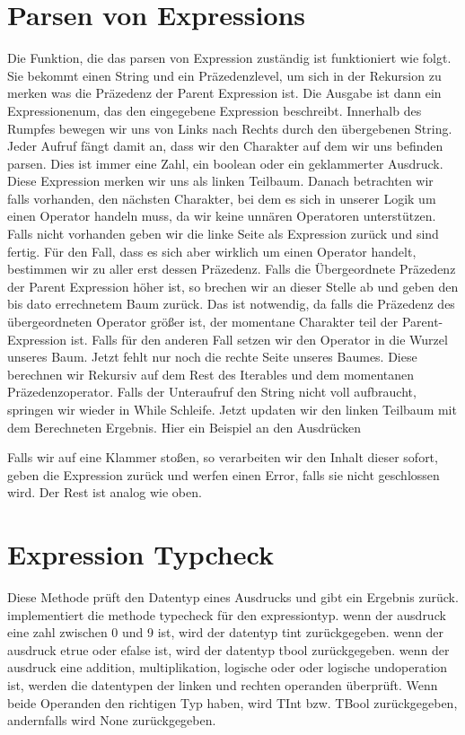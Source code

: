 \documentclass[a4paper, 1ppt]{article}
\begin{document}
\section{Parsen von Expressions}
Die Funktion, die das parsen von Expression zuständig ist funktioniert wie folgt.
Sie bekommt einen String und ein Präzedenzlevel, um sich in der Rekursion zu merken
was die Präzedenz der Parent Expression ist. Die Ausgabe ist dann ein Expressionenum, das den eingegebene Expression beschreibt.
Innerhalb des Rumpfes bewegen wir uns von Links nach Rechts durch den übergebenen String.
Jeder Aufruf fängt damit an, dass wir den Charakter auf dem wir uns befinden parsen.
Dies ist immer eine Zahl, ein boolean oder ein geklammerter Ausdruck. 
Diese Expression merken wir uns als linken Teilbaum.
Danach betrachten wir falls vorhanden, den nächsten Charakter, bei dem es sich in unserer Logik um einen Operator handeln muss, 
da wir keine unnären Operatoren unterstützen. Falls nicht vorhanden geben wir die linke Seite als Expression zurück und sind fertig.
Für den Fall, dass es sich aber wirklich um einen Operator handelt, bestimmen wir zu aller erst dessen Präzedenz.
Falls die Übergeordnete Präzedenz der Parent Expression höher ist, so brechen wir an dieser Stelle ab und geben den bis dato errechnetem Baum zurück.
Das ist notwendig, da falls die Präzedenz des übergeordneten Operator größer ist, der momentane Charakter teil der Parent-Expression ist.
Falls für den anderen Fall setzen wir den Operator in die Wurzel unseres Baum. 
Jetzt fehlt nur noch die rechte Seite unseres Baumes.
Diese berechnen wir Rekursiv auf dem Rest des Iterables und dem momentanen Präzedenzoperator.
Falls der Unteraufruf den String nicht voll aufbraucht, springen wir wieder in While Schleife.
Jetzt updaten wir den linken Teilbaum mit dem Berechneten Ergebnis.
Hier ein Beispiel an den Ausdrücken 

Falls wir auf eine Klammer stoßen, so verarbeiten wir den Inhalt dieser sofort, geben die Expression zurück und werfen einen Error, falls sie nicht geschlossen wird. Der Rest ist analog wie oben.
\section{Expression Typcheck}
Diese Methode prüft den Datentyp eines Ausdrucks und gibt ein Ergebnis zurück.
implementiert die methode typecheck für den expressiontyp.
wenn der ausdruck eine zahl zwischen 0 und 9 ist, wird der datentyp tint zurückgegeben.
wenn der ausdruck etrue oder efalse ist, wird der datentyp tbool zurückgegeben.
wenn der ausdruck eine addition, multiplikation, logische oder oder logische undoperation ist, werden die datentypen der linken und rechten operanden überprüft.
Wenn beide Operanden den richtigen Typ haben, wird TInt bzw.
TBool zurückgegeben, andernfalls wird None zurückgegeben.
\end{document}
